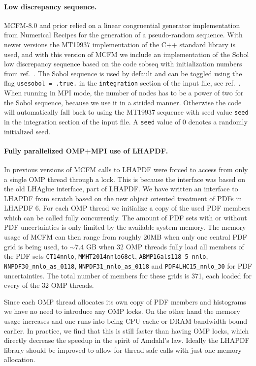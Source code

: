 \paragraph{Low discrepancy sequence.}
MCFM-8.0 and prior relied on a linear congruential generator implementation from Numerical Recipes for the 
generation of a pseudo-random sequence. With newer versions the MT19937 implementation of the C++ standard library is 
used, and with this version of MCFM we include an implementation of the Sobol low discrepancy sequence based on the 
code sobseq \cite{Vugt2016} with initialization numbers from ref.~\cite{Joe2010}. The Sobol sequence is 
used by default and can be toggled using the flag \texttt{usesobol = .true.} in the \texttt{integration} 
section of 
the input file, see ref.~\cite{MCFM9}. When running in MPI mode, the number of nodes has to be a power 
of two for the Sobol sequence, because we use it in a strided manner. Otherwise the code will automatically fall back 
to 
using the MT19937 sequence with seed value \texttt{seed} in the integration section of the input file. A \texttt{seed} 
value of $0$ denotes a randomly initialized seed.


\paragraph{Fully parallelized OMP+MPI use of LHAPDF.}

In previous versions of MCFM calls to LHAPDF were forced to access from only a single OMP thread
through a lock. This is because the interface was based on the old LHAglue interface, part
of LHAPDF. We have written an interface to LHAPDF from scratch based on the new object oriented treatment
of PDFs in LHAPDF 6. For each OMP thread we initialize a copy of the used PDF members which
can be called fully concurrently. The amount of PDF sets with or without PDF uncertainties is only limited
by the available system memory. The memory usage of MCFM can then range from roughly 20MB when only one central 
PDF grid is being used, to $\sim 7.4$ GB when 32 OMP threads fully load
all members of the PDF sets \texttt{CT14nnlo}, \texttt{MMHT2014nnlo68cl}, \texttt{ABMP16als118\_5\_nnlo},
 \texttt{NNPDF30\_nnlo\_as\_0118}, \texttt{NNPDF31\_nnlo\_as\_0118} and \texttt{PDF4LHC15\_nnlo\_30} for
 PDF uncertainties. The total number of members for these grids is 371, each loaded for every of the
 32 OMP threads.
 
Since each OMP thread allocates its own copy of PDF members and histograms we have no need to introduce
any OMP locks. On the other hand the memory usage increases and one runs into being CPU cache or DRAM
bandwidth bound earlier. In practice, we find that this is still faster than having OMP locks, which directly
decrease the speedup in the spirit of Amdahl's law. Ideally the LHAPDF library should be improved to allow for 
thread-safe calls with just one memory allocation.

